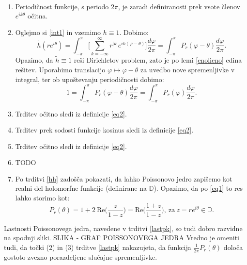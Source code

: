 \documentclass[mat1]{fmfdelo}
\begin{document}
    \begin{dokaz}
        $ $
        \begin{enumerate}
            \item Periodičnost funkcije, s periodo $2\pi$, je zaradi definiranosti prek vsote členov $e^{ik\theta}$ očitna. 
            \item Oglejmo si \ref{int1} in vzemimo $h \equiv 1$. Dobimo: 
            $$
                \widetilde{h}(r e^{i \theta}) = \int_{-\pi}^{\pi}{\bigg[\sum_{k=-\infty}^{\infty}{r^{|k|} e^{ik(\varphi - \theta)}}\bigg] \frac{d \varphi}{2 \pi}} = \int_{-\pi}^{\pi}{P_r(\varphi - \theta)\frac{d \varphi}{2 \pi}}. 
            $$
            Opazimo, da $\widetilde{h} \equiv 1$ reši Dirichletov problem, zato je po lemi \ref{enolicno} edina rešitev. Uporabimo translacijo $\varphi \mapsto \varphi - \theta$ za uvedbo nove spremenljivke v integral, ter ob upoštevanju periodičnosti dobimo:
            $$
                1 = \int_{-\pi}^{\pi}{P_r(\varphi - \theta)\frac{d \varphi}{2 \pi}} = \int_{-\pi}^{\pi}{P_r(\varphi)\frac{d \varphi}{2 \pi}}.
            $$
            \item Trditev očitno sledi iz definicije \ref{eq2}. 
            \item Trditev prek sodosti funkcije kosinus sledi iz definicije \ref{eq2}. 
            \item Trditev očitno sledi iz definicije \ref{eq2}.
            \item TODO 
            \item Po trditvi \ref{hh} zadošča pokazati, da lahko Poissonovo jedro zapišemo kot realni del holomorfne funkcije (definirane na $\mathbb{D}$). Opazimo, da po \ref{eq1} to res lahko storimo kot:
            $$
                P_r(\theta) = 1 + 2~\text{Re}\bigg(\frac{z}{1-z}\bigg) = \text{Re}\bigg(\frac{1+z}{1-z}\bigg),~\text{za}~z= re^{i\theta} \in \mathbb{D}.
            $$
        \end{enumerate}
    \end{dokaz}
    \begin{opomba}
        Lastnosti Poissonovega jedra, navedene v trditvi \ref{lastpk}, so tudi dobro razvidne na spodnji sliki. 
        \newline
        SLIKA - GRAF POISSONOVEGA JEDRA
        \newline
        Vredno je omeniti tudi, da točki (2) in (3) trditve \ref{lastpk} nakazujeta, da funkcija $\frac{1}{2 \pi} P_r(\theta)$ določa gostoto zvezno porazdeljene slučajne spremenljivke.
    \end{opomba}
\end{document}
